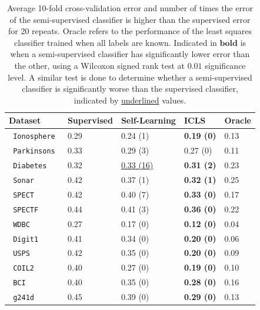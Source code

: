 \documentclass{llncs}
\begin{document}
% 
\begin{table}[t]
\caption{Average 10-fold cross-validation error and number of times the error of the semi-supervised classifier is higher than the supervised error for 20 repeats. Oracle refers to the performance of the least squares classifier trained when all labels are known. Indicated in $\mathbf{bold}$ is when a semi-supervised classifier has significantly lower error than the other, using a Wilcoxon signed rank test at $0.01$ significance level. A similar test is done to determine whether a semi-supervised classifier is significantly worse than the supervised classifier, indicated by \underline{underlined} values.} \label{table:cvresults}
\centering
\begin{tabular}{lllll}
  \hline
Dataset & Supervised \hspace{0.3cm} & Self-Learning \hspace{0.3cm} & ICLS \hspace{01.3cm} & Oracle \\ 
  \hline
\texttt{ Ionosphere } & 0.29 & 0.24 (1) & \textbf{0.19 (0)} & 0.13 \\ 
  \texttt{ Parkinsons } & 0.33 & 0.29 (3) & 0.27 (0) & 0.11 \\ 
  \texttt{ Diabetes } & 0.32 & \underline{0.33 (16)} & \textbf{0.31 (2)} & 0.23 \\ 
  \texttt{ Sonar } & 0.42 & 0.37 (1) & \textbf{0.32 (1)} & 0.25 \\ 
  \texttt{ SPECT } & 0.42 & 0.40 (7) & \textbf{0.33 (0)} & 0.17 \\ 
  \texttt{ SPECTF } & 0.44 & 0.41 (3) & \textbf{0.36 (0)} & 0.22 \\ 
  \texttt{ WDBC } & 0.27 & 0.17 (0) & \textbf{0.12 (0)} & 0.04 \\ 
  \texttt{ Digit1 } & 0.41 & 0.34 (0) & \textbf{0.20 (0)} & 0.06 \\ 
  \texttt{ USPS } & 0.42 & 0.35 (0) & \textbf{0.20 (0)} & 0.09 \\ 
  \texttt{ COIL2 } & 0.40 & 0.27 (0) & \textbf{0.19 (0)} & 0.10 \\ 
  \texttt{ BCI } & 0.40 & 0.35 (0) & \textbf{0.28 (0)} & 0.16 \\ 
  \texttt{ g241d } & 0.45 & 0.39 (0) & \textbf{0.29 (0)} & 0.13 \\ 
   \hline
\end{tabular}
\end{table}
\end{document}
